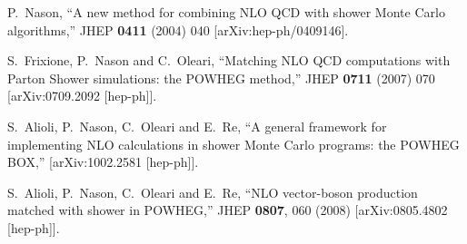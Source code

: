 \documentclass[paper]{JHEP3}
\begin{document}
\begin{thebibliography}{10}

  P.~Nason,
  ``A new method for combining NLO QCD with shower Monte Carlo algorithms,''
  JHEP {\bf 0411} (2004) 040
  [arXiv:hep-ph/0409146].

  S.~Frixione, P.~Nason and C.~Oleari,
``Matching NLO QCD computations with Parton Shower simulations: the POWHEG
method,''
  JHEP {\bf 0711} (2007) 070
  [arXiv:0709.2092 [hep-ph]].

  S.~Alioli, P.~Nason, C.~Oleari and E.~Re,
``A general framework for implementing NLO calculations in shower Monte Carlo
  programs: the POWHEG BOX,''
  [arXiv:1002.2581 [hep-ph]].

 S.~Alioli, P.~Nason, C.~Oleari and E.~Re,
  ``NLO vector-boson production matched with shower in POWHEG,''
  JHEP {\bf 0807}, 060 (2008)
  [arXiv:0805.4802 [hep-ph]].


\end{thebibliography}
\end{document}
